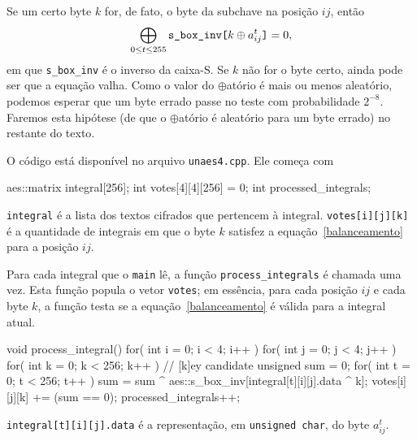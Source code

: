 \documentclass{article}
\newcommand{\xor}{\oplus}
\begin{document}
Se um certo byte $k$ for, de fato,
o byte da subchave na posição $ij$,
então
\begin{equation}
    \label{balanceamento}
    \bigoplus_{0 \leq t \leq 255} \verb"s_box_inv["k \xor a^t_{ij}\verb"]" = 0,
\end{equation}
em que \verb"s_box_inv" é o inverso da caixa-S.
Se $k$ não for o byte certo, ainda pode ser que a equação valha.
Como o valor do $\xor$atório é mais ou menos aleatório,
podemos esperar que um byte errado passe no teste
com probabilidade $2^{-8}$.
Faremos esta hipótese
(de que o $\xor$atório é aleatório para um byte errado)
no restante do texto.

O código está disponível no arquivo \verb"unaes4.cpp".
Ele começa com
\begin{cppcode}
    aes::matrix integral[256];
    int votes[4][4][256] = {0};
    int processed_integrals;
\end{cppcode}

\verb"integral" é a lista dos textos cifrados que pertencem à integral.
\verb"votes[i][j][k]" é a quantidade de integrais
em que o byte $k$ satisfez a equação~\ref{balanceamento}
para a posição $ij$.

Para cada integral que o \verb"main" lê,
a função \verb"process_integrals" é chamada uma vez.
Esta função popula o vetor \verb"votes";
em essência, para cada posição $ij$ e cada byte $k$,
a função testa se a equação~\ref{balanceamento} é válida para a integral atual.
\begin{cppcode}
    void process_integral() {
        for( int i = 0; i < 4; i++ )
        for( int j = 0; j < 4; j++ )
        for( int k = 0; k < 256; k++ ) { // [k]ey candidate
            unsigned sum = 0;
            for( int t = 0; t < 256; t++ )
                sum = sum ^ aes::s_box_inv[integral[t][i][j].data ^ k];
            votes[i][j][k] += (sum == 0);
        }
        processed_integrals++;
    }
\end{cppcode}
\verb"integral[t][i][j].data" é a representação,
em \verb"unsigned char",
do byte $a^t_{ij}$.
\end{document}
